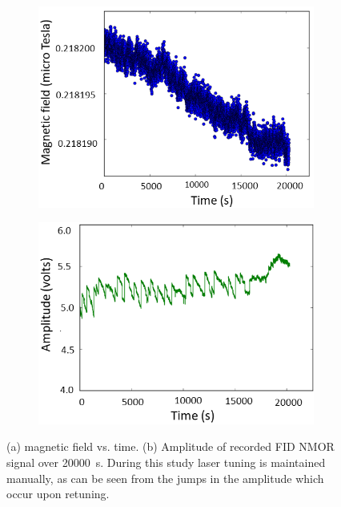 \begin{figure}
  \centering
  \begin{subfigure}[b]{0.5\textwidth}
    \centering
    \includegraphics[width=\textwidth]{figures/manual_tuning}
    \caption{}
    \label{fig:field-manual-tuning}
  \end{subfigure}
  \hfill
  \begin{subfigure}[b]{0.49\textwidth}
    \centering
    \includegraphics[width=\textwidth]{figures/amplitude_manual_tuning}
    \caption{}
    \label{fig:amplitude-manual-tuning}
  \end{subfigure}
  \caption{(a) magnetic field vs. time. (b)  Amplitude of recorded
    FID NMOR signal over 20000~s. During this study laser tuning is
    maintained manually, as can be seen from the jumps in the
    amplitude which occur upon retuning.}
  \label{fig:manual-tuning}
\end{figure}
   
